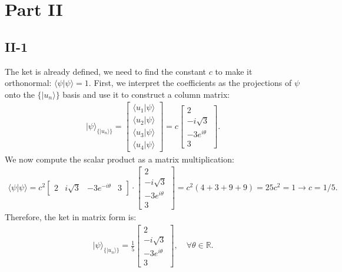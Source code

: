 \documentclass[letterpaper,11pt,twoside]{article}
\newcommand{\ket}[1]{|#1\rangle}
\newcommand{\braket}[1]{\langle#1\rangle}
\begin{document}
\section*{Part II}
%
\subsection*{II-1}
  The ket is already defined, we need to find the constant $c$ to make it orthonormal: $\braket{\psi|\psi}=1$. First, we interpret the coefficients as the projections of $\psi$ onto the 
  $\{\ket{u_n}\}$ basis and use it to construct a column matrix:
  \begin{align*}
    \ket{\psi}_{\{\ket{u_n}\}}=\begin{bmatrix}
      \braket{u_1|\psi}\\\braket{u_2|\psi}\\\braket{u_3|\psi}\\\braket{u_4|\psi}
    \end{bmatrix}=c\begin{bmatrix}
      2\\-i\sqrt{3}\\-3e^{i\theta}\\3
    \end{bmatrix}.
  \end{align*}
  We now compute the scalar product as a matrix multiplication:
  \begin{align*}
    \braket{\psi|\psi}=c^2\begin{bmatrix}
      2&i\sqrt{3}&-3e^{-i\theta}&3
    \end{bmatrix}\cdot\begin{bmatrix}
      2\\-i\sqrt{3}\\-3e^{i\theta}\\3
    \end{bmatrix}=c^2(4+3+9+9)=25c^2=1\longrightarrow c=1/5.
  \end{align*}
  Therefore, the ket in matrix form is:
  \begin{align}
    \ket{\psi}_{\{\ket{u_n}\}}=\frac{1}{5}\begin{bmatrix}
      2\\-i\sqrt{3}\\-3e^{i\theta}\\3
    \end{bmatrix},\quad\forall\theta\in\mathbb{R}.
  \end{align}
\end{document}
